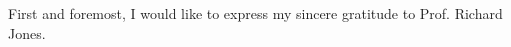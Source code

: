 \label{chap:Acknowledgements}

First and foremost, I would like to express my sincere gratitude to Prof. Richard Jones. 